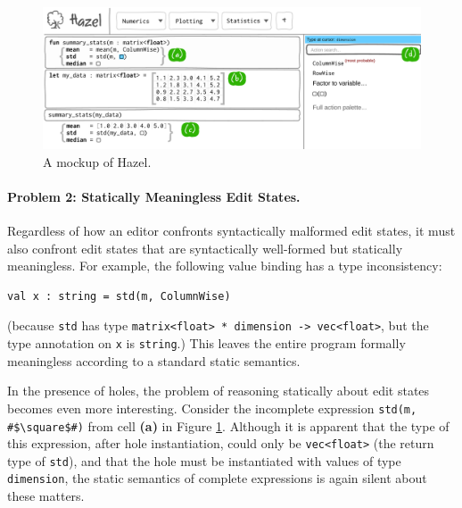 \documentclass[letterpaper,USenglish]{lipics-v2016}
\let\li\lstinline
\newcommand{\Hazel}[0]{\textsf{Hazel}}
\newcommand{\HazelEnv}[0]{\Hazel}
\begin{document}
\begin{figure}
\includegraphics[width=1.025\textwidth]{mockup-1}
\caption{A mockup of \HazelEnv.}
\label{fig:hazel-mockup}
\end{figure}

\paragraph{Problem 2: Statically Meaningless Edit States.} Regardless of how an 
editor confronts syntactically malformed edit states, it must also confront 
edit states that are syntactically well-formed but statically meaningless. For
example, the following value binding has a type inconsistency:
\begin{lstlisting}[numbers=none]
val x : string = std(m, ColumnWise)
\end{lstlisting}
(because \li{std} has type \li{matrix<float> * dimension -> vec<float>},
but the type annotation on \li{x} is \li{string}.) This leaves the entire program
formally meaningless according to a standard static semantics.

In the presence of holes, the problem of reasoning statically about edit states
becomes even more interesting.  Consider the incomplete expression \lstinline{std(m, #$\square$#)} 
from cell \textbf{(a)} in Figure \ref{fig:hazel-mockup}.
%
%
Although it is apparent that the type of this expression, after hole instantiation, could only be \lstinline{vec<float>} (the return type of \lstinline{std}),
and that the hole must be instantiated with values of type \li{dimension}, the static
semantics of complete expressions is again silent about these matters. 
\end{document}

